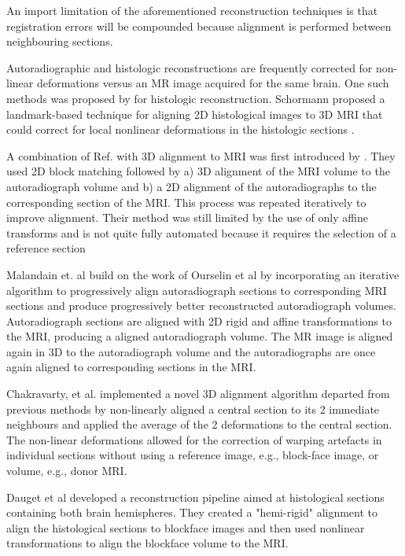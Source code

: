 \documentclass[12pt]{article}
\begin{document}
An import limitation of the aforementioned reconstruction techniques is that registration errors will be compounded because alignment is performed between neighbouring sections. 

Autoradiographic and histologic reconstructions are frequently corrected for non-linear deformations versus an MR image acquired for the same brain. One such methods was proposed by \cite{Schormann1993} for histologic reconstruction. Schormann proposed a landmark-based technique for aligning 2D histological images to 3D MRI that could correct for local nonlinear deformations in the histologic sections \cite{Shormann1995}. 

A combination of Ref. \cite{Ourselin2001} with 3D alignment to MRI was first introduced by \cite{Malandain2004}. They used 2D block matching followed by a) 3D alignment of the MRI volume to the autoradiograph volume and b) a 2D alignment of the autoradiographs to the corresponding section of the MRI. This process was repeated iteratively to improve alignment. Their method was still limited by the use of only affine transforms and is not quite fully automated because it requires the selection of a reference section

Malandain et. al \cite{Malandain2004} build on the work of Ourselin et al \cite{Ourselin2001} by incorporating an iterative algorithm to progressively align autoradiograph sections to corresponding MRI sections and produce progressively better reconstructed autoradiograph volumes. Autoradiograph sections are aligned with 2D rigid and affine transformations to the MRI, producing a aligned autoradiograph volume. The MR image is aligned again in 3D to the autoradiograph volume and the autoradiographs are once again aligned to corresponding sections in the MRI.

Chakravarty, et al. \cite{Chakravarty2003,Chakravarty2005} implemented a novel 3D alignment algorithm departed from previous methods by non-linearly aligned a central section to its 2 immediate neighbours and applied the average of the 2 deformations to the central section. The non-linear deformations allowed for the correction of warping artefacts in individual sections without using a reference image, e.g., block-face image, or volume, e.g., donor MRI. 

Dauget et al \cite{Dauget2007} developed a reconstruction pipeline aimed at histological sections containing both brain hemispheres. They created a "hemi-rigid" alignment to align the histological sections to blockface images and then used nonlinear transformations to align the blockface volume to the MRI. 
\end{document}
